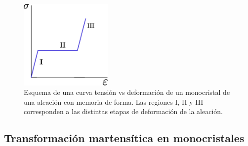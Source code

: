 \documentclass[a4paper,12pt,fleqn,twoside,openany]{book}
\begin{document}
% 
 


\begin{figure}[h]
 \centering
 \includegraphics[width=0.4\textwidth]{Img/Introduccion/SigmavsDef.eps}
 \caption{Esquema de una curva tensión vs deformación de un monocristal de una aleación con memoria de forma. Las regiones I, II y III corresponden a las distintas etapas de deformación de la aleación.}
 \label{fig:TensDefSMAMono}
 \end{figure}

 \subsection{Transformación martensítica en monocristales}
\end{document}
